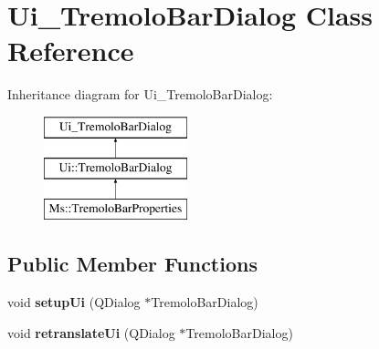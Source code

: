 \hypertarget{class_ui___tremolo_bar_dialog}{}\section{Ui\+\_\+\+Tremolo\+Bar\+Dialog Class Reference}
\label{class_ui___tremolo_bar_dialog}
Inheritance diagram for Ui\+\_\+\+Tremolo\+Bar\+Dialog\+:\begin{figure}[H]
\begin{center}
\leavevmode
\includegraphics[height=3.000000cm]{class_ui___tremolo_bar_dialog}
\end{center}
\end{figure}
\subsection*{Public Member Functions}
\begin{DoxyCompactItemize}
\item 
\mbox{\label{class_ui___tremolo_bar_dialog_a6dcdda6d0ce6d7cf5d916fa20726ec1f}} 
void {\bfseries setup\+Ui} (Q\+Dialog $\ast$Tremolo\+Bar\+Dialog)
\item 
\mbox{\label{class_ui___tremolo_bar_dialog_a23a3c0b611e131173f970ef8bd840802}} 
void {\bfseries retranslate\+Ui} (Q\+Dialog $\ast$Tremolo\+Bar\+Dialog)
\end{DoxyCompactItemize}
